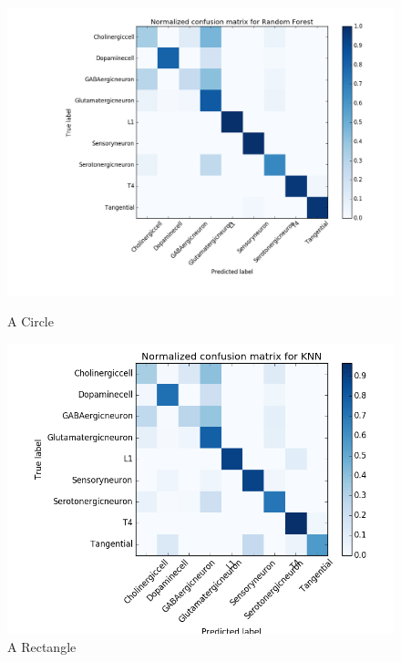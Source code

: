 \documentclass[10pt,twocolumn]{article}
\begin{document}
\begin{figure}[htbp] 
	\begin{minipage}{0.5\linewidth} 
		\centering 
		\includegraphics[width=\textwidth]{img/RFmatrix.png} 
		\caption{A Circle} 
		\label{fig:circle} 
	\end{minipage}%
	\begin{minipage}{0.5\linewidth} 
		\centering 
		\includegraphics[width=\textwidth]{img/KNNmatrix.png}
		\caption{A Rectangle} 
		\label{fig:rectangle} 
	 \end{minipage}
\end{figure}
\end{document}
